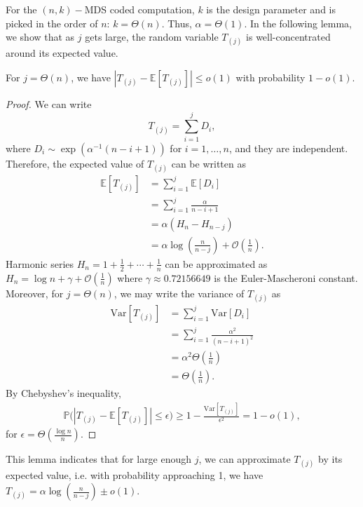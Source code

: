 \documentclass[onecolumn,journal,twoside]{IEEEtran}
\newcommand{\Prob}{\mathbb{P}}
\newcommand{\var}{\text{Var}}
\newcommand{\Expc}{\mathbb{E}}
\begin{document}
For the $(n,k)-$MDS coded computation, $k$ is the design parameter and is picked in the order of $n$: $k=\Theta(n)$. Thus, $\alpha=\Theta(1)$. In the following lemma, we show that as $j$ gets large, the random variable $T_{(j)}$ is well-concentrated around its expected value.
\begin{lemma}\label{lemma:expc_approx}
For $j=\Theta(n)$, we have $| T_{(j)} - \mathbb{E}[T_{(j)}] | \leq o(1)$ with probability $1-o(1)$.
\end{lemma}
\begin{proof}
We can write 
\begin{equation}
T_{(j)}=\sum_{i=1}^{j} D_i,
\end{equation}
where $D_i\sim \exp(\alpha^{-1}(n-i+1))$ for $i=1, \dots, n$, and they are independent. Therefore, the expected value of $T_{(j)}$ can be written as 
\begin{align}
\Expc[T_{(j)}]&= \sum_{i=1}^{j} \Expc[D_i]\nonumber\\
&=  \sum_{i=1}^{j} \frac{\alpha}{n-i+1}\nonumber\\
&= \alpha (H_n - H_{n-j}) \nonumber\\
&= \alpha \log (\frac{n}{n-j}) + \mathcal{O}(\frac{1}{n}).
\end{align}
Harmonic series $H_n=1+\frac{1}{2}+\cdots+ \frac{1}{n}$ can be approximated as $H_n=\log n + \gamma + \mathcal{O}(\frac{1}{n})$ where $ \gamma \approx 0.72156649$ is the Euler-Mascheroni constant. Moreover, for $j=\Theta(n)$, we may write the variance of $T_{(j)}$ as
\begin{align}
\var[T_{(j)}]&= \sum_{i=1}^{j} \var[D_i]\nonumber\\
&=  \sum_{i=1}^{j} \frac{\alpha^2}{(n-i+1)^2}\nonumber\\
&= \alpha^2  \Theta(\frac{1}{n})\nonumber\\
&=  \Theta(\frac{1}{n}).
\end{align}
By Chebyshev's inequality, 
\begin{align}
\Prob \big(| T_{(j)} - \mathbb{E}[T_{(j)}] |\leq \epsilon \big) \geq 1-\frac{\var[T_{(j)}]}{\epsilon^2}=1-o(1),
\end{align}
for $\epsilon=\Theta(\frac{\log n}{n})$. 
\end{proof}
This lemma indicates that for large enough $j$, we can approximate $T_{(j)}$ by its expected value, i.e. with probability approaching 1, we have $T_{(j)}=\alpha \log (\frac{n}{n-j}) \pm o(1)$.
\end{document}
